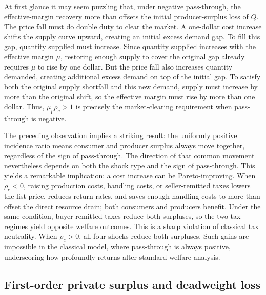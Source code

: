 \documentclass[11pt]{article}
\begin{document}
At first glance it may seem puzzling that, under negative pass-through, the
effective-margin recovery more than offsets the initial producer-surplus
loss of $Q$.  The price fall must do double duty to clear the market.  A one-dollar cost increase shifts the supply curve upward, creating
an initial excess demand gap.  To fill this gap, quantity supplied must
increase.  Since quantity supplied increases with the effective margin
$\mu$, restoring enough supply to cover the original gap already requires
$\mu$ to rise by one dollar.  But the price fall also increases quantity
demanded, creating additional excess demand on top of the initial gap.  To
satisfy both the original supply shortfall and this new demand, supply must
increase by more than the original shift, so the effective margin must rise
by more than one dollar.  Thus, $\mu_p\rho_c>1$ is precisely the
market-clearing requirement when pass-through is negative.

The preceding observation implies a striking result: the uniformly positive
incidence ratio means consumer and producer surplus always move together,
regardless of the sign of pass-through.  The direction of that common
movement nevertheless depends on both the shock type and the sign of
pass-through.  This yields a remarkable implication: a cost increase can be
Pareto-improving.  When $\rho_c<0$, raising production costs, handling costs,
or seller-remitted taxes lowers the list price, reduces return rates, and
saves enough handling costs to more than offset the direct resource drain;
both consumers and producers benefit.  Under the same condition,
buyer-remitted taxes reduce both surpluses, so the two tax regimes yield
opposite welfare outcomes.  This is a sharp violation of classical tax
neutrality.
When $\rho_c>0$, all four shocks reduce both surpluses.  Such gains are
impossible in the classical model, where pass-through is always positive,
underscoring how profoundly returns alter standard welfare analysis.

\subsection{First-order private surplus and deadweight loss}
\label{sec:DWL}
\end{document}
